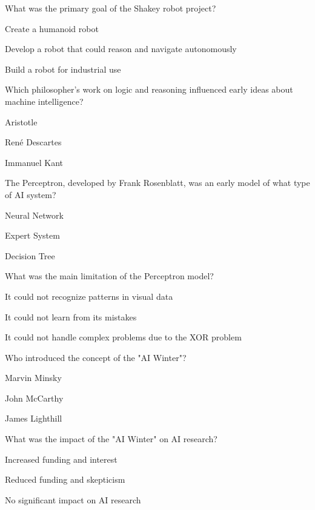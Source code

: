 \begin{enhancedmcq}{What was the primary goal of the Shakey robot project?}
\item Create a humanoid robot
\item Develop a robot that could reason and navigate autonomously
\item Build a robot for industrial use

\end{enhancedmcq}
\begin{enhancedmcq}{Which philosopher's work on logic and reasoning influenced early ideas about machine intelligence?}
\item Aristotle
\item René Descartes
\item Immanuel Kant

\end{enhancedmcq}
\begin{enhancedmcq}{The Perceptron, developed by Frank Rosenblatt, was an early model of what type of AI system?}
\item Neural Network
\item Expert System
\item Decision Tree

\end{enhancedmcq}
\begin{enhancedmcq}{What was the main limitation of the Perceptron model?}
\item It could not recognize patterns in visual data
\item It could not learn from its mistakes
\item It could not handle complex problems due to the XOR problem

\end{enhancedmcq}
\begin{enhancedmcq}{Who introduced the concept of the "AI Winter"?}
\item Marvin Minsky
\item John McCarthy
\item James Lighthill

\end{enhancedmcq}
\begin{enhancedmcq}{What was the impact of the "AI Winter" on AI research?}
\item Increased funding and interest
\item Reduced funding and skepticism
\item No significant impact on AI research

\end{enhancedmcq}
